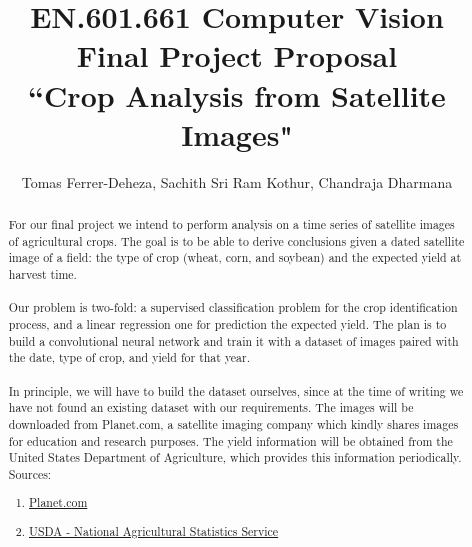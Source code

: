 \documentclass[]{report}
\title{EN.601.661 Computer Vision \\Final Project Proposal\\ ``Crop Analysis from Satellite Images"}
\author{Tomas Ferrer-Deheza, Sachith Sri Ram Kothur, Chandraja Dharmana}
\begin{document}
\maketitle

\begin{abstract}
	For our final project we intend to perform analysis on a time series of satellite images of agricultural crops. The goal is to be able to derive conclusions given a dated satellite image of a field: the type of crop (wheat, corn, and soybean) and the expected yield at harvest time.\\\\
	Our problem is two-fold: a supervised classification problem for the crop identification process, and a linear regression one for prediction the expected yield. The plan is to build a convolutional neural network and train it with a dataset of images paired with the date, type of crop, and yield for that year.\\\\
	In principle, we will have to build the dataset ourselves, since at the time of writing we have not found an existing dataset with our requirements. The images will be downloaded from Planet.com, a satellite imaging company which kindly shares images for education and research purposes. The yield information will be obtained from the United States Department of Agriculture, which provides this information periodically.\\
	
	Sources: 
	\begin{enumerate}
		\item \href{https://www.planet.com/markets/monitoring-for-precision-agriculture/}{Planet.com}
		\item \href{https://www.nass.usda.gov/}{USDA - National Agricultural Statistics Service}
	\end{enumerate}
	
	
	
\end{abstract}


\begin{abstract}
\end{abstract}
\end{document}

